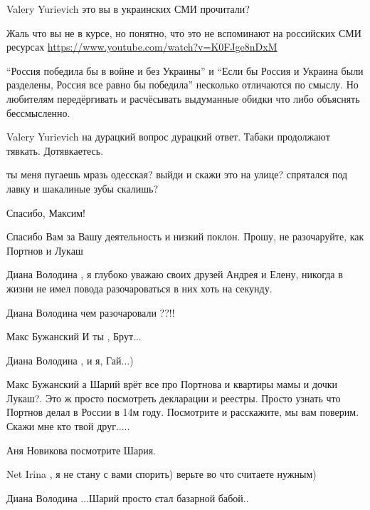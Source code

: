 \begin{itemize}
\begin{itemize}
Valery Yurievich это вы в украинских СМИ прочитали?


Жаль что вы не в курсе, но понятно, что это не вспоминают на российских СМИ ресурсах 
\url{https://www.youtube.com/watch?v=K0FJge8nDxM}


\enquote{Россия победила бы в войне и без Украины} и \enquote{Если бы Россия и
Украина были разделены, Россия все равно бы победила} несколько
отличаются по смыслу. Но любителям передёргивать и расчёсывать
выдуманные обидки что либо объяснять бессмысленно.


Valery Yurievich на дурацкий вопрос дурацкий ответ. Табаки продолжают тявкать. Дотявкаетесь.


ты меня пугаешь мразь одесская? выйди и скажи это на улице? спрятался под лавку
и шакалиные зубы скалишь?
\end{itemize}

Спасибо, Максим!


Спасибо Вам за Вашу деятельность и низкий поклон. Прошу, не разочаруйте, как
Портнов и Лукаш

\begin{itemize}
Диана Володина , я глубоко уважаю своих друзей Андрея и Елену, никогда в жизни не имел повода разочароваться в них хоть на секунду.

Диана Володина чем разочаровали ??!!

Макс Бужанский И ты , Брут...

Диана Володина , и я, Гай...)

Макс Бужанский а Шарий врёт все про Портнова и квартиры мамы и дочки Лукаш?.
Это ж просто посмотреть декларации и реестры. Просто узнать что Портнов делал в
России в 14м году. Посмотрите и расскажите, мы вам поверим. Скажи мне кто твой
друг.....

Аня Новикова посмотрите Шария.

Net Irina , я не стану с вами спорить) верьте во что считаете нужным)

Диана Володина ...Шарий просто стал базарной бабой..


\end{itemize}
\end{itemize}
